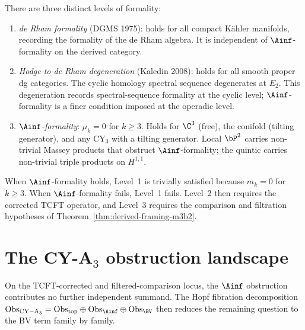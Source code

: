 \begin{remark}
\label{rem:formality-three-levels}
There are three distinct levels of formality:
\begin{enumerate}[label=\textup{(\roman*)}]
 \item \emph{de Rham formality} (DGMS 1975): holds for all compact
 K\"ahler manifolds, recording the formality of the de Rham
 algebra. It is independent of $\Ainf$-formality on the
 derived category.
 \item \emph{Hodge-to-de Rham degeneration} (Kaledin 2008):
 holds for all smooth proper dg categories. The cyclic
 homology spectral sequence degenerates at $E_2$. This
 degeneration records spectral-sequence formality at the
 cyclic level; $\Ainf$-formality is a finer condition
 imposed at the operadic level.
 \item \emph{$\Ainf$-formality}: $\mu_k = 0$ for $k \geq 3$.
 Holds for $\C^3$ (free), the conifold (tilting generator),
 and any CY$_3$ with a tilting generator. Local $\bP^2$
 carries non-trivial Massey products that obstruct
 $\Ainf$-formality; the quintic carries non-trivial triple
 products on $H^{1, 1}$.
\end{enumerate}
When $\Ainf$-formality holds, Level~1 is trivially satisfied
because $m_k = 0$ for $k \geq 3$.  When $\Ainf$-formality fails,
Level~1 fails.  Level~2 then requires the corrected TCFT
operator, and Level~3 requires the comparison and filtration
hypotheses of Theorem~\ref{thm:derived-framing-m3b2}.
\end{remark}


\section{The CY-A\texorpdfstring{$_3$}{-3} obstruction landscape}
\label{sec:m3b2-landscape}

On the TCFT-corrected and filtered-comparison locus, the
$\Ainf$ obstruction contributes no further independent summand.
The Hopf fibration decomposition
$\mathrm{Obs}_{\mathrm{CY-A}_3}
 = \mathrm{Obs}_{\mathrm{top}} \oplus \mathrm{Obs}_{\Ainf}
 \oplus \mathrm{Obs}_{\BV}$
then reduces the remaining question to the BV term family by
family.

